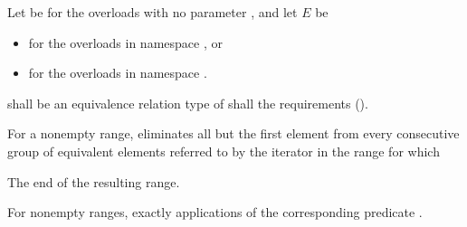 \begin{itemdescr}
{\color{newclr}
\pnum
Let  be  for the overloads with no
parameter , and let $E$ be
\begin{itemize}
\item {}
  for the overloads in namespace , or
\item {}
  for the overloads in namespace .
\end{itemize}
} %

\pnum
\requires
{}  shall be
an equivalence relation 
type of  shall   the
 requirements ().

\pnum
\effects
For a nonempty range, eliminates all but the first element from every
consecutive group of equivalent elements referred to by the iterator
in the range
for which  

\pnum
\returns
The end of the resulting range.

\pnum
\complexity
For nonempty ranges, exactly
applications of the corresponding predicate .
\end{itemdescr}


